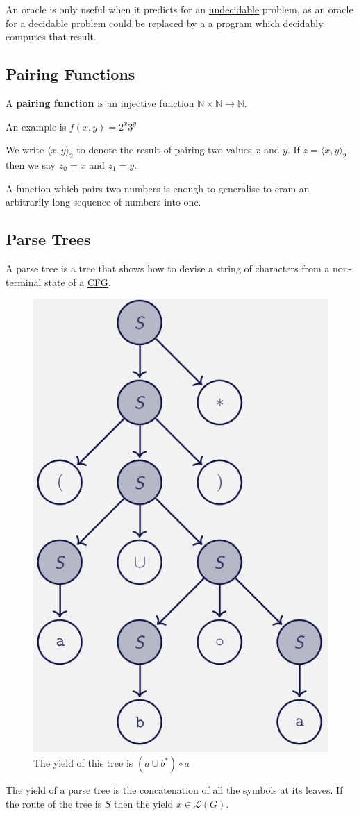 \documentclass{article}
\begin{document}
An oracle is only useful when it predicts for an \hyperref[undecidable]{undecidable} problem, as an oracle for a \hyperref[decidable]{decidable} problem could be replaced by a a program which decidably computes that result.


\subsection{Pairing Functions}\label{pairing-function}
A \textbf{pairing function} is an \hyperref[injective]{injective} function $\mathbb{N} \times \mathbb{N} \to \mathbb{N}$.

An example is $f(x, y) = 2^x3^y$

We write $\langle x, y \rangle_2$ to denote the result of pairing two values $x$ and $y$. If $z = \langle x, y \rangle_2$ then we say $z_0 = x$ and $z_1 = y$.

A function which pairs two numbers is enough to generalise to cram an arbitrarily long sequence of numbers into one.


\subsection{Parse Trees}\label{parse-trees}
A parse tree is a tree that shows how to devise a string of characters from a non-terminal state of a \hyperref[cfg]{CFG}.

\begin{figure}[H]
    \centering
    \includegraphics[width=0.35\linewidth]{images/parse-tree.png}
    \caption{The yield of this tree is $(a \cup b^*) \circ a$}
\end{figure}

The yield of a parse tree is the concatenation of all the symbols at its leaves. If the route of the tree is $S$ then the yield $x \in \mathcal{L}(G)$.
\end{document}
